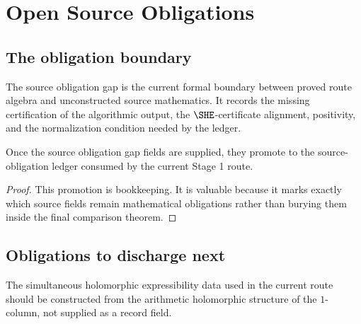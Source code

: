 \chapter{Open Source Obligations}
\label{ch:source-obligations}

\section{The obligation boundary}

\begin{definition}
  \label{def:source-obligation-gap}
  \leanok
  The source obligation gap is the current formal boundary between proved
  route algebra and unconstructed source mathematics.  It records the missing
  certification of the algorithmic output, the \(\SHE\)-certificate alignment,
  \qPilot{} positivity, and the normalization condition needed by the ledger.
\end{definition}

\begin{proposition}
  \label{prop:gap-promotion-formal}
  \leanok
  Once the source obligation gap fields are supplied, they promote to the
  source-obligation ledger consumed by the current Stage 1 route.
\end{proposition}

\begin{proof}
  This promotion is bookkeeping.  It is valuable because it marks exactly which
  source fields remain mathematical obligations rather than burying them inside
  the final comparison theorem.
\end{proof}

\section{Obligations to discharge next}

\begin{theorem}
  \label{thm:construct-she}
  \notready
  The simultaneous holomorphic expressibility data used in the current route
  should be constructed from the arithmetic holomorphic structure of the
  \(1\)-column, not supplied as a record field.
\end{theorem}

